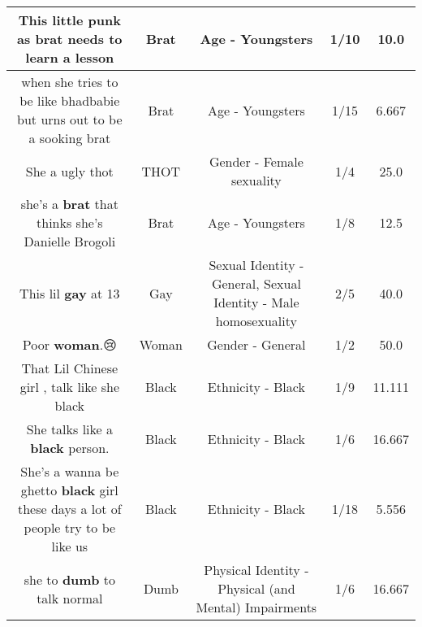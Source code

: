 \documentclass[11pt]{article}
\newlength\mylength
\begin{document}
\begin{center}
\begin{longtable}{|C{.65\mylength}|C{.30\mylength}|C{.12\mylength}|C{.12\mylength}|C{.12\mylength}|}
  \small This little punk as \textbf{brat} needs to learn a lesson\normalsize   & Brat & Age - Youngsters & 1/10 & 10.0 \\  \hline
  \small when she tries to be like bhadbabie but urns out to be a sooking brat\normalsize   & Brat & Age - Youngsters & 1/15 & 6.667 \\  \hline
  \small She a ugly thot\normalsize   & THOT & Gender - Female sexuality & 1/4 & 25.0 \\  \hline
  \small she's a \textbf{brat} that thinks she's Danielle Brogoli\normalsize   & Brat & Age - Youngsters & 1/8 & 12.5 \\  \hline
  \small This lil \textbf{g\textbf{ay}} at 13\normalsize   & Gay & Sexual Identity - General, Sexual Identity - Male homosexuality & 2/5 & 40.0 \\  \hline
  \small Poor \textbf{woman}.😢\normalsize   & Woman & Gender - General & 1/2 & 50.0 \\  \hline
  \small That Lil Chinese girl , talk like she black\normalsize   & Black & Ethnicity - Black & 1/9 & 11.111 \\  \hline
  \small She talks like a \textbf{black} person.\normalsize   & Black & Ethnicity - Black & 1/6 & 16.667 \\  \hline
  \small She's a wanna be ghetto \textbf{black} girl these days a lot of people try to be like us\normalsize   & Black & Ethnicity - Black & 1/18 & 5.556 \\  \hline
  \small she to \textbf{dumb} to talk normal\normalsize   & Dumb & Physical Identity - Physical (and Mental) Impairments & 1/6 & 16.667 \\  \hline

\end{longtable}
\end{center}
\end{document}
